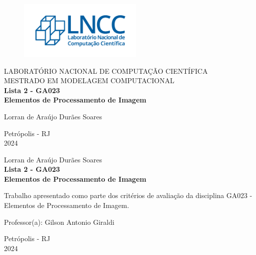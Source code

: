 \documentclass[a4paper, 11pt]{article}
\begin{document}
\begin{titlepage}
	\begin{center}
	\begin{figure}[!ht]
	\centering
	\includegraphics[width=6cm]{imgs/LNCC.png}
	\end{figure}
		LABORATÓRIO NACIONAL DE COMPUTAÇÃO CIENTÍFICA\\
		MESTRADO EM MODELAGEM COMPUTACIONAL\\ 
		\vspace{7cm}
		{\Large \textbf{Lista 2 - GA023 \\ Elementos de Processamento de Imagem}}
		\vspace{3cm}
	\end{center}
	
	\begin{flushright}
            Lorran de Araújo Durães Soares\\
	 \end{flushright}

	\begin{center}
		\vspace{\fill}
		 Petrópolis - RJ\\
         2024
	\end{center}
\end{titlepage}

\begin{titlepage}
	\begin{center}
        Lorran de Araújo Durães Soares \\
      \vspace{7cm}
      {\Large \textbf{Lista 2 - GA023 \\ Elementos de Processamento de Imagem}}
	\end{center}
\vspace{3cm}
	\begin{flushright}
   \begin{list}{}{
      \setlength{\leftmargin}{5cm}
      \setlength{\rightmargin}{0cm}
      \setlength{\labelwidth}{0pt}
      \setlength{\labelsep}{\leftmargin}}
      \begin{flushright}
          \item Trabalho apresentado  como  parte  dos  critérios 
de avaliação da disciplina GA023 - Elementos de Processamento de Imagem.
       \item Professor(a): Gilson Antonio Giraldi
      \end{flushright}
      
   \end{list}
	\end{flushright}

	\begin{center}
		\vspace{\fill}
		 Petrópolis - RJ\\
         2024
	\end{center}
\end{titlepage}
\end{document}
